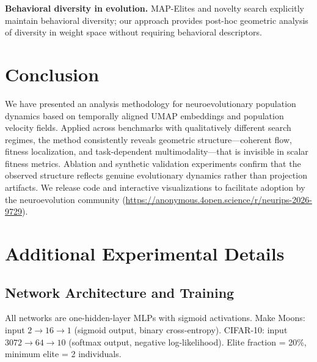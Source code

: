 \documentclass{article}
\begin{document}
\textbf{Behavioral diversity in evolution.} MAP-Elites
\cite{mouret2015illuminating} and novelty search
\cite{lehman2011abandoning} explicitly maintain behavioral diversity;
our approach provides post-hoc geometric analysis of diversity in
weight space without requiring behavioral descriptors.


\section{Conclusion}

We have presented an analysis methodology for neuroevolutionary
population dynamics based on temporally aligned UMAP embeddings and
population velocity fields. Applied across benchmarks with qualitatively
different search regimes, the method consistently reveals geometric
structure---coherent flow, fitness localization, and
task-dependent multimodality---that is invisible in scalar
fitness metrics. Ablation and synthetic validation experiments confirm
that the observed structure reflects genuine evolutionary dynamics
rather than projection artifacts. We release code and interactive
visualizations to facilitate adoption by the neuroevolution community
(\url{https://anonymous.4open.science/r/neurips-2026-9729}).

\begin{ack}
\end{ack}





\appendix

\section{Additional Experimental Details}

\subsection{Network Architecture and Training}

All networks are one-hidden-layer MLPs with sigmoid activations.
Make Moons: input $2 \to 16 \to 1$ (sigmoid output, binary
cross-entropy). CIFAR-10: input $3072 \to 64 \to 10$ (softmax output,
negative log-likelihood). Elite fraction = 20\%, minimum elite = 2
individuals.
\end{document}
